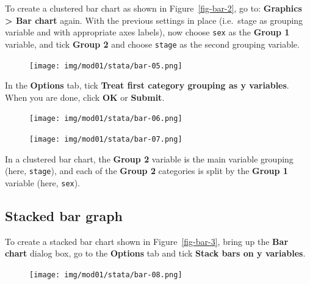\documentclass[
  a4paper,
]{memoir}
\begin{document}
To create a clustered bar chart as shown in Figure~\ref{fig-bar-2}, go
to: \textbf{Graphics \textgreater{} Bar chart} again. With the previous
settings in place (i.e.~stage as grouping variable and with appropriate
axes labels), now choose \texttt{sex} as the \textbf{Group 1} variable,
and tick \textbf{Group 2} and choose \texttt{stage} as the second
grouping variable.

\begin{figure}[H]

{\centering \texttt{[image: img/mod01/stata/bar-05.png]}

}

\end{figure}

In the \textbf{Options} tab, tick \textbf{Treat first category grouping
as y variables}. When you are done, click \textbf{OK} or
\textbf{Submit}.

\begin{figure}[H]

{\centering \texttt{[image: img/mod01/stata/bar-06.png]}

}

\end{figure}

\begin{figure}[H]

{\centering \texttt{[image: img/mod01/stata/bar-07.png]}

}

\end{figure}

In a clustered bar chart, the \textbf{Group 2} variable is the main
variable grouping (here, \texttt{stage}), and each of the \textbf{Group
2} categories is split by the \textbf{Group 1} variable (here,
\texttt{sex}).

\hypertarget{stacked-bar-graph}{%
\subsection{Stacked bar graph}\label{stacked-bar-graph}}

To create a stacked bar chart shown in Figure~\ref{fig-bar-3}, bring up
the \textbf{Bar chart} dialog box, go to the \textbf{Options} tab and
tick \textbf{Stack bars on y variables}.

\begin{figure}[H]

{\centering \texttt{[image: img/mod01/stata/bar-08.png]}

}

\end{figure}
\end{document}
